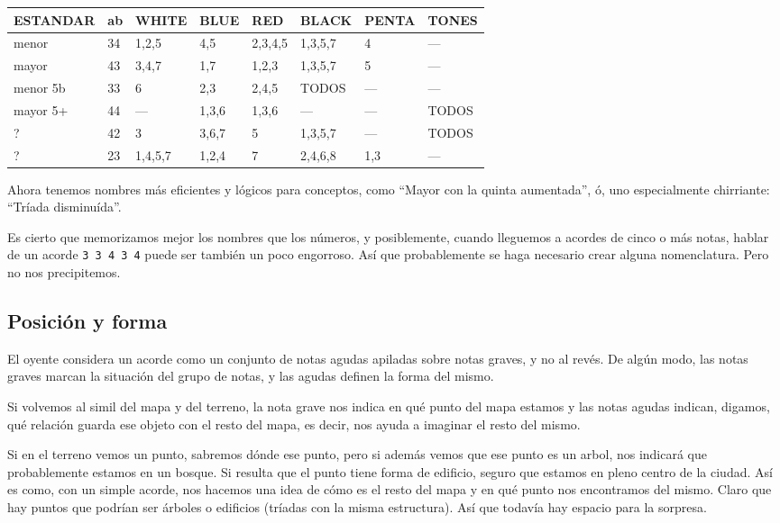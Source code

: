 \documentclass[]{report}
\begin{document}
  \begin{table}[H]
    \centering
    \begin{tabular}{|l|l|l|l|l|l|l|l|}
      \hline
      ESTANDAR & ab & WHITE & BLUE & RED & BLACK & PENTA & TONES \\
      \hline
      menor& 34 & 1,2,5 & 4,5 & 2,3,4,5 & 1,3,5,7 & 4 & --- \\
      \hline
      mayor & 43 & 3,4,7 & 1,7 & 1,2,3 & 1,3,5,7 & 5 & --- \\
      \hline
      menor 5b & 33 & 6 & 2,3 & 2,4,5 & TODOS & --- & --- \\
      \hline
      mayor 5+ & 44 & --- & 1,3,6 & 1,3,6 & --- & --- & TODOS \\
      \hline
      ? & 42 & 3 & 3,6,7 & 5 & 1,3,5,7 & --- & TODOS \\
      \hline
      ? & 23 & 1,4,5,7 & 1,2,4 & 7 & 2,4,6,8 & 1,3 & --- \\
      \hline
    \end{tabular} 
  \end{table}
  
  
  Ahora tenemos nombres más eficientes y lógicos para conceptos, como ``Mayor con la quinta aumentada'', ó, uno especialmente chirriante: ``Tríada disminuída''.
  
  Es cierto que memorizamos mejor los nombres que los números, y posiblemente, cuando lleguemos a acordes de cinco o más notas, hablar de un acorde \texttt{3\ 3\ 4\ 3\ 4} puede ser también un poco engorroso. Así que probablemente se haga necesario crear alguna nomenclatura. Pero no nos precipitemos.
  
  \subsection{Posición y forma}
  
  El oyente considera un acorde como un conjunto de notas agudas apiladas sobre notas graves, y no al revés. De algún modo, las notas graves marcan la situación del grupo de notas, y las agudas definen la forma del mismo.
  
  Si volvemos al simil del mapa y del terreno, la nota grave nos indica en qué punto del mapa estamos y las notas agudas indican, digamos, qué relación guarda ese objeto con el resto del mapa, es decir, nos ayuda a imaginar el resto del mismo.
  
  Si en el terreno vemos un punto, sabremos dónde ese punto, pero si además vemos que ese punto es un arbol, nos indicará que probablemente estamos en un bosque. Si resulta que el punto tiene forma de edificio, seguro que estamos en pleno centro de la ciudad. Así es como, con un simple acorde, nos hacemos una idea de cómo es el resto del mapa y en qué punto nos encontramos del mismo. Claro que hay puntos que podrían ser árboles o edificios (tríadas con la misma estructura). Así que todavía hay espacio para la sorpresa.
  
\end{document}
